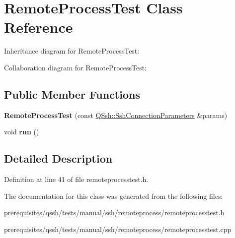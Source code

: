 \hypertarget{class_remote_process_test}{}\section{Remote\+Process\+Test Class Reference}
\label{class_remote_process_test}


Inheritance diagram for Remote\+Process\+Test\+:


Collaboration diagram for Remote\+Process\+Test\+:
\subsection*{Public Member Functions}
\begin{DoxyCompactItemize}
\item 
\mbox{\label{class_remote_process_test_a4c0e4232c926642a405ca6529398d082}} 
{\bfseries Remote\+Process\+Test} (const \mbox{\hyperlink{class_q_ssh_1_1_ssh_connection_parameters}{Q\+Ssh\+::\+Ssh\+Connection\+Parameters}} \&params)
\item 
\mbox{\label{class_remote_process_test_a29025a4ff0458a1cd6dd7c08b7e46e93}} 
void {\bfseries run} ()
\end{DoxyCompactItemize}


\subsection{Detailed Description}


Definition at line 41 of file remoteprocesstest.\+h.



The documentation for this class was generated from the following files\+:\begin{DoxyCompactItemize}
\item 
prerequisites/qssh/tests/manual/ssh/remoteprocess/remoteprocesstest.\+h\item 
prerequisites/qssh/tests/manual/ssh/remoteprocess/remoteprocesstest.\+cpp\end{DoxyCompactItemize}
